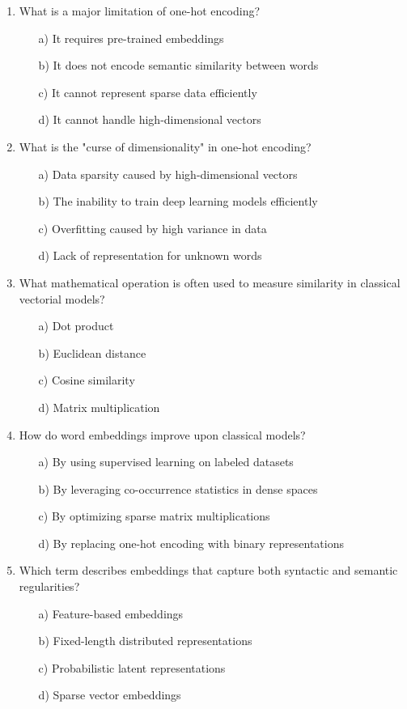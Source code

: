 \documentclass[8pt]{extarticle}
\begin{document}
\begin{multicols}{2}
\begin{enumerate}
\item What is a major limitation of one-hot encoding?
\begin{itemize}
\item[a)] It requires pre-trained embeddings
\item[b)] It does not encode semantic similarity between words
\item[c)] It cannot represent sparse data efficiently
\item[d)] It cannot handle high-dimensional vectors
\end{itemize}

\item What is the "curse of dimensionality" in one-hot encoding?
\begin{itemize}
\item[a)] Data sparsity caused by high-dimensional vectors
\item[b)] The inability to train deep learning models efficiently
\item[c)] Overfitting caused by high variance in data
\item[d)] Lack of representation for unknown words
\end{itemize}

\item What mathematical operation is often used to measure similarity in classical vectorial models?
\begin{itemize}
\item[a)] Dot product
\item[b)] Euclidean distance
\item[c)] Cosine similarity
\item[d)] Matrix multiplication
\end{itemize}

\item How do word embeddings improve upon classical models?
\begin{itemize}
\item[a)] By using supervised learning on labeled datasets
\item[b)] By leveraging co-occurrence statistics in dense spaces
\item[c)] By optimizing sparse matrix multiplications
\item[d)] By replacing one-hot encoding with binary representations
\end{itemize}

\item Which term describes embeddings that capture both syntactic and semantic regularities?
\begin{itemize}
\item[a)] Feature-based embeddings
\item[b)] Fixed-length distributed representations
\item[c)] Probabilistic latent representations
\item[d)] Sparse vector embeddings
\end{itemize}


\end{enumerate}
\end{multicols}
\end{document}
